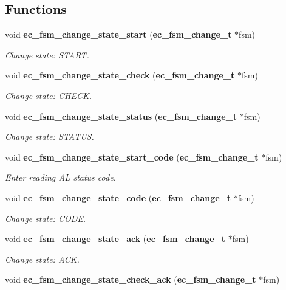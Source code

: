 \subsection*{\-Functions}
\begin{DoxyCompactItemize}
\item 
void {\bf ec\-\_\-fsm\-\_\-change\-\_\-state\-\_\-start} ({\bf ec\-\_\-fsm\-\_\-change\-\_\-t} $\ast$fsm)
\begin{DoxyCompactList}\small\item\em \-Change state\-: \-S\-T\-A\-R\-T. \end{DoxyCompactList}\item 
void {\bf ec\-\_\-fsm\-\_\-change\-\_\-state\-\_\-check} ({\bf ec\-\_\-fsm\-\_\-change\-\_\-t} $\ast$fsm)
\begin{DoxyCompactList}\small\item\em \-Change state\-: \-C\-H\-E\-C\-K. \end{DoxyCompactList}\item 
void {\bf ec\-\_\-fsm\-\_\-change\-\_\-state\-\_\-status} ({\bf ec\-\_\-fsm\-\_\-change\-\_\-t} $\ast$fsm)
\begin{DoxyCompactList}\small\item\em \-Change state\-: \-S\-T\-A\-T\-U\-S. \end{DoxyCompactList}\item 
void {\bf ec\-\_\-fsm\-\_\-change\-\_\-state\-\_\-start\-\_\-code} ({\bf ec\-\_\-fsm\-\_\-change\-\_\-t} $\ast$fsm)
\begin{DoxyCompactList}\small\item\em \-Enter reading \-A\-L status code. \end{DoxyCompactList}\item 
void {\bf ec\-\_\-fsm\-\_\-change\-\_\-state\-\_\-code} ({\bf ec\-\_\-fsm\-\_\-change\-\_\-t} $\ast$fsm)
\begin{DoxyCompactList}\small\item\em \-Change state\-: \-C\-O\-D\-E. \end{DoxyCompactList}\item 
void {\bf ec\-\_\-fsm\-\_\-change\-\_\-state\-\_\-ack} ({\bf ec\-\_\-fsm\-\_\-change\-\_\-t} $\ast$fsm)
\begin{DoxyCompactList}\small\item\em \-Change state\-: \-A\-C\-K. \end{DoxyCompactList}\item 
void {\bf ec\-\_\-fsm\-\_\-change\-\_\-state\-\_\-check\-\_\-ack} ({\bf ec\-\_\-fsm\-\_\-change\-\_\-t} $\ast$fsm)

\end{DoxyCompactItemize}
